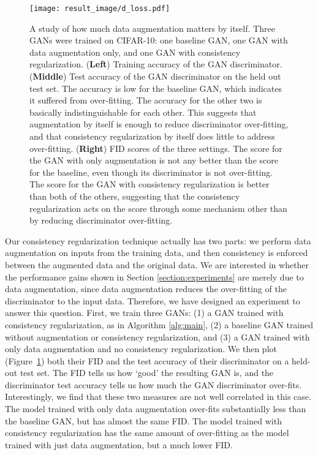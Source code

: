 \documentclass{article} \usepackage{iclr2020_conference,times}
\begin{document}
\begin{figure}[t]
    \centering
    \texttt{[image: result\_image/d\_loss.pdf]}
    \caption{
    A study of how much data augmentation matters by itself.
    Three GANs were trained on CIFAR-10: one baseline GAN, one GAN with data augmentation 
    only, and one GAN with consistency regularization.
    (\textbf{Left}) Training accuracy of the GAN discriminator. 
    (\textbf{Middle}) Test accuracy of the GAN discriminator on the held out test set. 
    The accuracy is low for the baseline GAN, which indicates it suffered from over-fitting. 
    The accuracy for the other two is
    basically indistinguishable for each other. This suggests that augmentation by itself is enough to reduce discriminator
    over-fitting, and that consistency regularization by itself does little to address
    over-fitting.
    (\textbf{Right})
    FID scores of the three settings. 
    The score for the GAN with only augmentation is not any better than the score for the
    baseline, even though its discriminator is not over-fitting.
    The score for the GAN with consistency regularization is better than both of the others, suggesting that the consistency regularization acts on the score through some 
    mechanism other than by reducing discriminator over-fitting.
    }
    \label{fig:d_loss}
\end{figure}

Our consistency regularization technique actually has two parts: 
we perform data augmentation on inputs from the training data,
and then consistency is enforced between the augmented data and the 
original data. We are interested in whether the performance gains shown in Section \ref{section:experiments} are merely due to data augmentation, since data augmentation reduces the over-fitting of the discriminator to the input data. Therefore, we have designed an experiment to answer this question. 
First, we train three GANs:
(1) a GAN trained with consistency regularization, as in Algorithm \ref{alg:main},
(2) a baseline GAN trained without augmentation or consistency regularization, and 
(3) a GAN trained with only data augmentation and no consistency regularization.
We then plot (Figure~\ref{fig:d_loss}) both their FID and the test accuracy of their discriminator on a held-out 
test set.
The FID tells us how `good' the resulting GAN is, and the discriminator test accuracy tells us
how much the GAN discriminator over-fits. Interestingly, we find that these two measures are not well correlated in this case. 
The model trained with only data augmentation over-fits substantially less than the baseline
GAN, but has almost the same FID. 
The model trained with consistency regularization has the same amount of over-fitting 
as the model trained with just data augmentation, but a much lower FID. 
\end{document}
